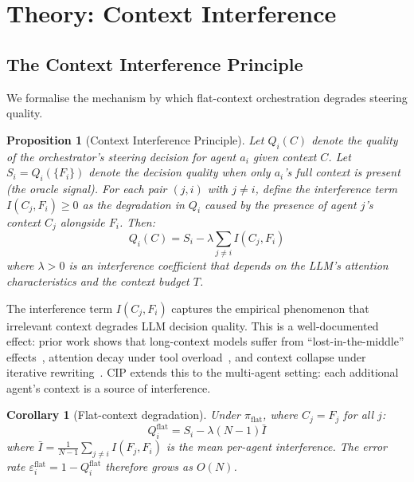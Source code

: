 \documentclass{article}
\newtheorem{proposition}{Proposition}
\newtheorem{corollary}{Corollary}
\begin{document}
\section{Theory: Context Interference}
\label{sec:theory}

\subsection{The Context Interference Principle}

We formalise the mechanism by which flat-context orchestration degrades
steering quality.

\begin{proposition}[Context Interference Principle]
\label{prop:cip}
Let $Q_i(C)$ denote the quality of the orchestrator's steering decision
for agent $a_i$ given context $C$.
Let $S_i = Q_i(\{F_i\})$ denote the decision quality when only $a_i$'s
full context is present (the oracle signal).
For each pair $(j, i)$ with $j \neq i$, define the
\emph{interference term}
$I(C_j, F_i) \geq 0$
as the degradation in $Q_i$ caused by the presence of agent $j$'s
context $C_j$ alongside $F_i$.
Then:
\begin{equation}
  Q_i(C) = S_i - \lambda \sum_{j \neq i} I(C_j, F_i)
  \label{eq:cip}
\end{equation}
where $\lambda > 0$ is an interference coefficient that depends on the
LLM's attention characteristics and the context budget $T$.
\end{proposition}

The interference term $I(C_j, F_i)$ captures the empirical phenomenon
that irrelevant context degrades LLM decision quality.
This is a well-documented effect: prior work shows that
long-context models suffer from ``lost-in-the-middle''
effects~\citep{afm2024}, attention decay under tool overload~\citep{adaptorch2025},
and context collapse under iterative rewriting~\citep{ace2026}.
CIP extends this to the multi-agent setting: each additional agent's
context is a source of interference.

\begin{corollary}[Flat-context degradation]
\label{cor:flat}
Under $\pi_{\text{flat}}$, where $C_j = F_j$ for all $j$:
\begin{equation}
  Q_i^{\text{flat}} = S_i - \lambda(N-1)\bar{I}
  \label{eq:flat_degrade}
\end{equation}
where $\bar{I} = \frac{1}{N-1}\sum_{j \neq i} I(F_j, F_i)$ is the
mean per-agent interference.
The error rate $\varepsilon_i^{\text{flat}} = 1 - Q_i^{\text{flat}}$
therefore grows as $O(N)$.
\end{corollary}
\end{document}
